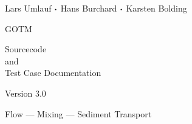 \documentclass[a4paper,twoside]{article}
\begin{document}
\begin{titlepage}


{\sf \bf \LARGE
 \begin{center}
   Lars Umlauf ${\boldsymbol \cdot}$ Hans Burchard ${\boldsymbol \cdot}$ Karsten Bolding
 \end{center}
}

\vspace{14mm}

{\sf \bf \Huge
 \begin{center}
   GOTM 
 \end{center}
}

\vspace{6mm}

{\sf \bf \LARGE
 \begin{center}
   Sourcecode \\ 
      and \\ 
Test Case Documentation
 \end{center}
}


\vspace{5mm}

{\sf \bf \Large
 \begin{center}
  Version 3.0 
 \end{center}
}


\vspace{10mm}

{\sf \bf \Large
 \begin{center}
  Flow ---  Mixing --- Sediment Transport
\end{center}
}


\end{titlepage}


\cleardoublepage
\tableofcontents


\cleardoublepage
 


\cleardoublepage
   
        

\cleardoublepage
 
      

\cleardoublepage
 
      

  
       

\cleardoublepage
 
      

\cleardoublepage
 
      

\cleardoublepage
   
       

\cleardoublepage
  
    
    

\cleardoublepage


\cleardoublepage

  
\end{document}
